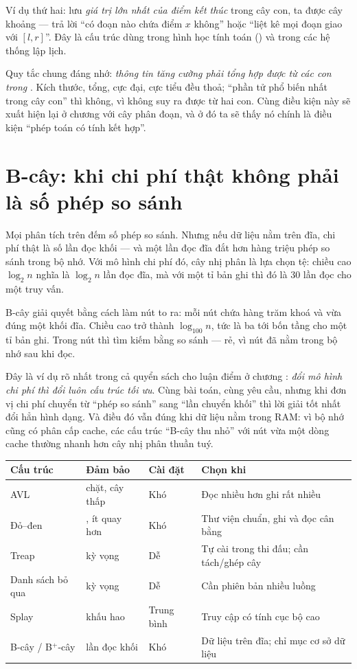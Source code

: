\documentclass[../../algorithm.tex]{subfiles}
\begin{document}
Ví dụ thứ hai: lưu \emph{giá trị lớn nhất của điểm kết thúc} trong cây con, ta được cây khoảng --- trả lời ``có đoạn nào chứa điểm \(x\) không'' hoặc ``liệt kê mọi đoạn giao với \([l,r]\)''. Đây là cấu trúc dùng trong hình học tính toán () và trong các hệ thống lập lịch.

Quy tắc chung đáng nhớ: \emph{thông tin tăng cường phải tổng hợp được từ các con trong }. Kích thước, tổng, cực đại, cực tiểu đều thoả; ``phần tử phổ biến nhất trong cây con'' thì không, vì không suy ra được từ hai con. Cùng điều kiện này sẽ xuất hiện lại ở chương  với cây phân đoạn, và ở đó ta sẽ thấy nó chính là điều kiện ``phép toán có tính kết hợp''.

\section{B-cây: khi chi phí thật không phải là số phép so sánh}

Mọi phân tích trên đếm số phép so sánh. Nhưng nếu dữ liệu nằm trên đĩa, chi phí thật là số lần đọc khối --- và một lần đọc đĩa đắt hơn hàng triệu phép so sánh trong bộ nhớ. Với mô hình chi phí đó, cây nhị phân là lựa chọn tệ: chiều cao \(\log_2 n\) nghĩa là \(\log_2 n\) lần đọc đĩa, mà với một tỉ bản ghi thì đó là 30 lần đọc cho một truy vấn.

B-cây giải quyết bằng cách làm nút to ra: mỗi nút chứa hàng trăm khoá và vừa đúng một khối đĩa. Chiều cao trở thành \(\log_{100} n\), tức là ba tới bốn tầng cho một tỉ bản ghi. Trong nút thì tìm kiếm bằng so sánh --- rẻ, vì nút đã nằm trong bộ nhớ sau khi đọc.

Đây là ví dụ rõ nhất trong cả quyển sách cho luận điểm ở chương : \emph{đổi mô hình chi phí thì đổi luôn cấu trúc tối ưu}. Cùng bài toán, cùng yêu cầu, nhưng khi đơn vị chi phí chuyển từ ``phép so sánh'' sang ``lần chuyển khối'' thì lời giải tốt nhất đổi hẳn hình dạng. Và điều đó vẫn đúng khi dữ liệu nằm trong RAM: vì bộ nhớ cũng có phân cấp cache, các cấu trúc ``B-cây thu nhỏ'' với nút vừa một dòng cache thường nhanh hơn cây nhị phân thuần tuý.

\begin{center}\footnotesize
\begin{tabularx}{\linewidth}{@{}L{2.6cm}L{2.5cm}L{2.6cm}Y@{}}
\toprule
\textbf{Cấu trúc} & \textbf{Đảm bảo} & \textbf{Cài đặt} & \textbf{Chọn khi}\\
\midrule
AVL &  chặt, cây thấp & Khó & Đọc nhiều hơn ghi rất nhiều\\
Đỏ--đen & , ít quay hơn & Khó & Thư viện chuẩn, ghi và đọc cân bằng\\
Treap &  kỳ vọng & Dễ & Tự cài trong thi đấu; cần tách/ghép cây\\
Danh sách bỏ qua &  kỳ vọng & Dễ & Cần phiên bản nhiều luồng\\
Splay &  khấu hao & Trung bình & Truy cập có tính cục bộ cao\\
B-cây / B\(^+\)-cây &  lần đọc khối & Khó & Dữ liệu trên đĩa; chỉ mục cơ sở dữ liệu\\
\bottomrule
\end{tabularx}
\end{center}
\end{document}
